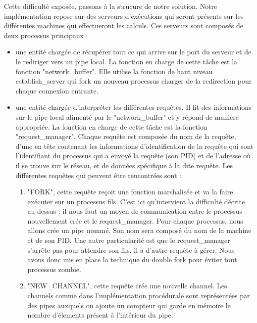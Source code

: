 \documentclass[a4paper, 12pt, twoside]{report}
\begin{document}
Cette difficulté exposée, passons à la strucure de notre solution. Notre implémentation repose sur des serveurs d'exécutions 
qui seront présents sur les différentes machines qui effectueront les calculs. Ces serveurs sont composés de deux processus 
principaux :\\
\begin{itemize}
  \item une entité chargée de récupérer tout ce qui arrive sur le port du serveur et de le rediriger vers un pipe local.
        La fonction en charge de cette tâche est la fonction "network\_buffer". Elle utilise la fonction de haut niveau 
        establish\_server qui fork un nouveau processus charger de la redirection pour chaque connexion entrante. 
  \item une entité chargée d'interpréter les différentes requêtes. Il lit des informations sur le pipe local alimenté par le 
        "network\_buffer" et y répond de manière appropriée. La fonction en charge de cette tâche est la fonction "request\_manager".
        Chaque requête est composée du nom de la requête, d'une 
        en tête contenant les informations d'identification de la requête qui sont l'identifiant du processus qui a 
        envoyé la requête (son PID) et de l'adresse où il se trouve sur le réseau, et de données spécifique à la dite 
        requête. Les différentes requêtes qui peuvent être rencontrées sont :\\
        \begin{enumerate}
          \item "FORK", cette requête reçoit une fonction marshalisée et va la faire exécuter sur un processus fils. C'est ici 
                qu'intervient la difficulté décrite au dessus : il nous faut un moyen de communication entre le processus 
                nouvellement crée et le request\_manager. Pour chaque processus, nous allons crée un pipe nommé. Son nom sera 
                composé du nom de la machine et de son PID. Une autre particularité est que le request\_manager s'arrête pas 
                pour attendre son fils, il a d'autre requête à gérer. Nous avons donc mis en place la technique du double 
                fork pour éviter tout processus zombie.
          \item "NEW\_CHANNEL", cette requête crée une nouvelle channel. Les channels comme dans l'implémentation procédurale
                sont représentées par des pipes auxquels on ajoute un compteur qui garde en mémoire le nombre d'élements 
                présent à l'intérieur du pipe.

\end{enumerate}
\end{itemize}
\end{document}
